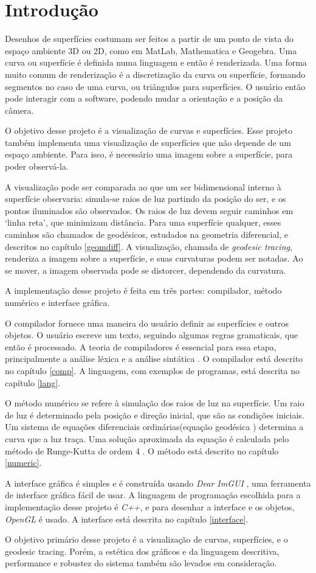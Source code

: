 \chapter{Introdução}
Desenhos de superfícies costumam ser feitos a partir de um ponto de vista do
espaço ambiente 3D ou 2D, como em MatLab, Mathematica e Geogebra.
Uma curva ou superfície é definida numa linguagem e então é renderizada.
Uma forma muito comum de renderização é a discretização da curva ou superfície,
formando segmentos no caso de uma curva, ou triângulos para superfícies.
O usuário então pode interagir com a software, podendo mudar a orientação e a posição
da câmera.

O objetivo desse projeto é a visualização de curvas e superfícies.
Esse projeto também implementa uma visualização de superfícies que não depende de um espaço ambiente.
Para isso, é necessário uma imagem sobre a superfície, para poder observá-la.

A visualização pode ser comparada ao que um ser bidimensional interno à superfície observaria:
simula-se raios de luz partindo da posição do ser, e os pontos iluminados são observados.
Os raios de luz devem seguir caminhos em `linha reta', que minimizam distância.
Para uma superfície qualquer, esses caminhos são chamados de geodésicos,
estudados na geometria diferencial, e descritos no capítulo \ref{geomdiff}.
A visualização, chamada de \textit{geodesic tracing}, renderiza a imagem sobre a superfície,
e suas curvaturas podem ser notadas. Ao se mover, a imagem observada pode se distorcer,
dependendo da curvatura.

A implementação desse projeto é feita em três partes:
compilador, método numérico e interface gráfica.

O compilador fornece uma maneira do usuário definir as superfícies e outros objetos.
O usuário escreve um texto, seguindo algumas regras gramaticais, que então é processado.
A teoria de compiladores é essencial para essa etapa,
principalmente a análise léxica e a análise sintática \cite{Dragon:1}.
O compilador está descrito no capítulo \ref{comp}.
A linguagem, com exemplos de programas, está descrita no capítulo \ref{lang}.

O método numérico se refere à simulação dos raios de luz na superfície.
Um raio de luz é determinado pela posição e direção inicial, que são as condições iniciais.
Um sistema de equações diferenciais ordinárias(equação geodésica \cite{GeomDiff:1})
determina a curva que a luz traça.
Uma solução aproximada da equação é calculada pelo método de Runge-Kutta de ordem 4 \cite{Anal:1}.
O método está descrito no capítulo \ref{numeric}.

A interface gráfica é simples e é construída usando \textit{Dear ImGUI} \cite{ImGui},
uma ferramenta de interface gráfica fácil de usar.
A linguagem de programação escolhida para a implementação desse projeto é \textit{C++},
e para desenhar a interface e os objetos, \textit{OpenGL} é usado.
A interface está descrita no capítulo \ref{interface}.

O objetivo primário desse projeto é a visualização de curvas, superfícies, e o geodesic tracing.
Porém, a estética dos gráficos e da linguagem descritiva, performance
e robustez do sistema também são levados em consideração.